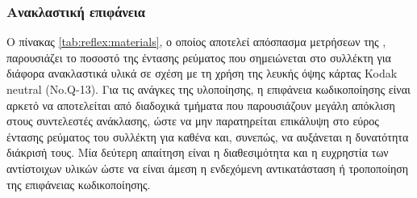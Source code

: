 \subsubsection{Ανακλαστική επιφάνεια}

Ο πίνακας \ref{tab:reflex:materials}, ο οποίος αποτελεί απόσπασμα μετρήσεων της
\textcite{vishay06},
παρουσιάζει το ποσοστό της έντασης ρεύματος που σημειώνεται στο συλλέκτη για
διάφορα ανακλαστικά υλικά σε σχέση με τη χρήση της λευκής όψης κάρτας Kodak
neutral (No\@.Q-13).
Για τις ανάγκες της υλοποίησης, η επιφάνεια κωδικοποίησης είναι αρκετό να
αποτελείται από διαδοχικά τμήματα που παρουσιάζουν μεγάλη απόκλιση στους
συντελεστές ανάκλασης, ώστε να μην παρατηρείται επικάλυψη στο εύρος έντασης
ρεύματος του συλλέκτη για καθένα και, συνεπώς, να αυξάνεται η δυνατότητα
διάκρισή τους. Μία δεύτερη απαίτηση είναι η διαθεσιμότητα και η ευχρηστία των
αντίστοιχων υλικών ώστε να είναι άμεση η ενδεχόμενη αντικατάσταση ή τροποποίηση
της επιφάνειας κωδικοποίησης.

